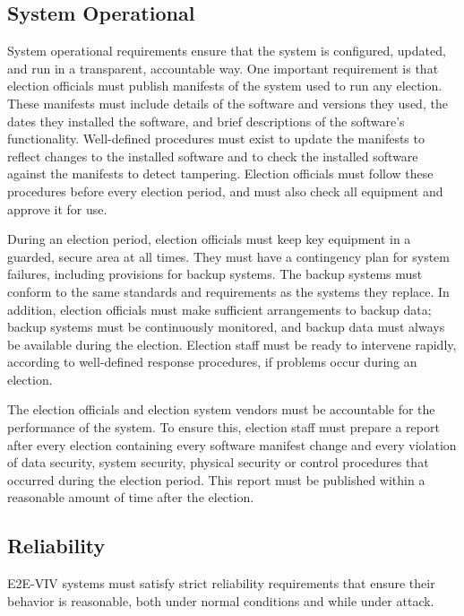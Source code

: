 \subsection{System Operational}

System operational requirements ensure that the system is configured,
updated, and run in a transparent, accountable way. One important
requirement is that election officials must publish manifests of the
system used to run any election. These manifests must include details
of the software and versions they used, the dates they installed the
software, and brief descriptions of the software's
functionality. Well-defined procedures must exist to update the
manifests to reflect changes to the installed software and to check
the installed software against the manifests to detect
tampering. Election officials must follow these procedures before
every election period, and must also check all equipment and approve
it for use.

During an election period, election officials must keep key equipment
in a guarded, secure area at all times. They must have a contingency
plan for system failures, including provisions for backup systems. The
backup systems must conform to the same standards and requirements as
the systems they replace. In addition, election officials must make
sufficient arrangements to backup data; backup systems must be
continuously monitored, and backup data must always be available
during the election. Election staff must be ready to intervene
rapidly, according to well-defined response procedures, if problems
occur during an election.

The election officials and election system vendors must be accountable
for the performance of the system. To ensure this, election staff must
prepare a report after every election containing every software
manifest change and every violation of data security, system security,
physical security or control procedures that occurred during the
election period. This report must be published within a reasonable
amount of time after the election.

\subsection{Reliability}

E2E-VIV systems must satisfy strict reliability requirements that
ensure their behavior is reasonable, both under normal conditions and
while under attack.

